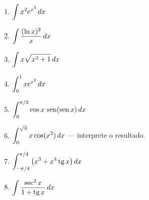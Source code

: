 \begin{exercicios}
\begin{enumerate}[leftmargin=1.6em, itemsep=2pt, label=\textbf{5.\arabic*}]
\item $\displaystyle\int x^2e^{x^3}\,dx$
\item $\displaystyle\int\frac{(\ln x)^2}{x}\,dx$
\item $\displaystyle\int x\sqrt{x^2+1}\,dx$
\item $\displaystyle\int_0^1 xe^{x^2}\,dx$
\item $\displaystyle\int_0^{\pi/2}\cos x\,\operatorname{sen}(\operatorname{sen} x)\,dx$
\item $\displaystyle\int_0^{\sqrt\pi}x\cos(x^2)\,dx$ --- interprete o resultado.
\item $\displaystyle\int_{-\pi/4}^{\pi/4}\big(x^3+x^4\operatorname{tg} x\big)\,dx$
\item $\displaystyle\int\frac{\sec^2x}{1+\operatorname{tg} x}\,dx$
\end{enumerate}
\end{exercicios}

